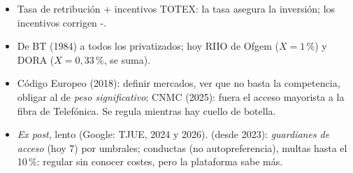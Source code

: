\documentclass{article}
\begin{document}
\begin{columnas}
\begin{itemize}
\item Tasa de retribución + incentivos TOTEX: la tasa asegura la inversión; los incentivos corrigen -.
\end{itemize}
\begin{itemize}
\item De BT (1984) a todos los privatizados; hoy RIIO de Ofgem ($X=1$\,\%) y DORA ($X=0{,}33$\,\%, se suma).
\end{itemize}
\begin{itemize}
\item Código Europeo (2018): definir mercados, ver que no basta la competencia, obligar al de \emph{peso significativo}; CNMC (2025): fuera el acceso mayorista a la fibra de Telefónica. Se regula mientras hay cuello de botella.
\end{itemize}
\begin{itemize}
\item \emph{Ex post}, lento (Google: TJUE, 2024 y 2026).  (desde 2023): \emph{guardianes de acceso} (hoy 7) por umbrales; conductas (no autopreferencia), multas hasta el 10\,\%: regular sin conocer costes, pero la plataforma sabe más.
\end{itemize}


\end{columnas}
\end{document}
